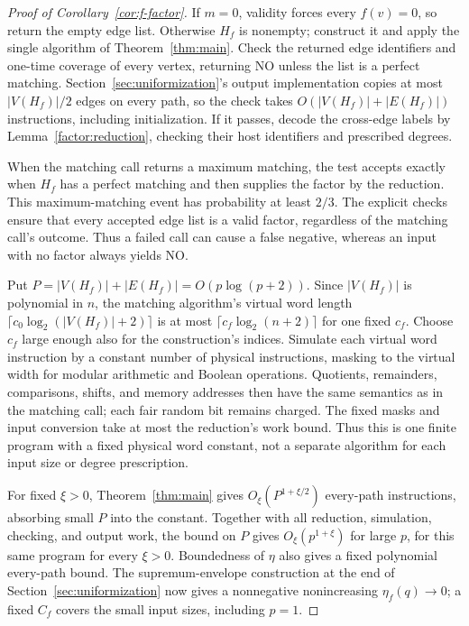 \begin{proof}[Proof of Corollary~\ref{cor:f-factor}]
If $m=0$, validity forces every $f(v)=0$, so return the empty edge list.
Otherwise $H_f$ is nonempty; construct it and apply the single algorithm of
Theorem~\ref{thm:main}. Check the returned edge identifiers and one-time
coverage of every vertex, returning \textnormal{NO} unless the list is a
perfect matching. Section~\ref{sec:uniformization}'s output implementation
copies at most $|V(H_f)|/2$ edges on every path, so the check takes
$O(|V(H_f)|+|E(H_f)|)$ instructions, including initialization. If it passes,
decode the cross-edge labels by Lemma~\ref{factor:reduction}, checking their
host identifiers and prescribed degrees.

When the matching call returns a maximum matching, the test accepts exactly
when $H_f$ has a perfect matching and then supplies the factor by the
reduction. This maximum-matching event has probability at least $2/3$.
The explicit checks ensure that every accepted edge list is a valid factor,
regardless of the matching call's outcome. Thus a failed call can cause a
false negative, whereas an input with no factor always yields \textnormal{NO}.

Put $P=|V(H_f)|+|E(H_f)|=O(p\log(p+2))$.
Since $|V(H_f)|$ is polynomial in $n$, the matching algorithm's virtual
word length $\lceil c_0\log_2(|V(H_f)|+2)\rceil$ is at most
$\lceil c_f\log_2(n+2)\rceil$ for one fixed $c_f$. Choose $c_f$ large
enough also for the construction's indices. Simulate each virtual word
instruction by a constant number of physical instructions, masking to the
virtual width for modular arithmetic and Boolean operations. Quotients,
remainders, comparisons, shifts, and memory addresses then have the same
semantics as in the matching call; each fair random bit remains charged.
The fixed masks and input conversion take at most the reduction's work
bound. Thus this is one finite program with a fixed physical word constant,
not a separate algorithm for each input size or degree prescription.

For fixed $\xi>0$, Theorem~\ref{thm:main} gives $O_\xi(P^{1+\xi/2})$
every-path instructions, absorbing small $P$ into the constant. Together
with all reduction, simulation, checking, and output work, the bound on $P$
gives $O_\xi(p^{1+\xi})$ for large $p$, for this same program for
every $\xi>0$. Boundedness of $\eta$ also gives a fixed polynomial every-path
bound. The supremum-envelope construction at the end of
Section~\ref{sec:uniformization} now gives a nonnegative nonincreasing
$\eta_f(q)\to0$; a fixed $C_f$ covers the small input sizes, including $p=1$.
\end{proof}
